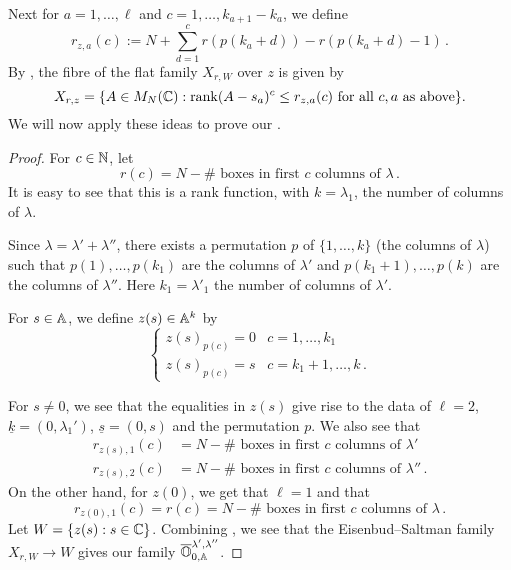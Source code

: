 \documentclass{article}
\begin{document}
Next for $ a = 1, \dots, \ell $ and $ c = 1, \dots, k_{a+1} - k_a$, we define
$$
    r_{z,a}(c):= N + \sum_{d = 1}^c r(p(k_a + d)) - r(p(k_a + d) - 1)  \, . 
$$
By \cite[Corollary 2.2]{eisenbud1989rank}, the fibre of the flat family $ X_{r,W} $ over $ z$ is given by
\begin{equation} 
    \label{eq:ESfibre}
    X_{r,z} = \{ A \in M_N(\CC) :\rk (A-s_a)^c\le r_{z,a}(c) \text{ for all } c , a \text{ as above}\}.
\end{equation}
% 
We will now apply these ideas to prove our .
% 
\begin{proof}
% 
For $ c\in \NN$, let
$$
    r(c) = N - \#\text{~boxes in first $c$ columns of }\lambda\,.
$$
It is easy to see that this is a rank function, with $ k = \lambda_1$, the number of columns of $ \lambda$.

Since $\lambda = \lambda' + \lambda''$, there exists a permutation $ p $ of $ \{1, \dots, k\}$ (the columns of $ \lambda$) such that $ p(1), \dots, p(k_1) $ are the columns of $ \lambda'$ and $ p(k_1+1), \dots, p(k)$ are the columns of $ \lambda''$. Here $ k_1 = \lambda'_1$ the number of columns of $ \lambda'$.

For $ s \in \AA$, we define $ z(s) \in \AA^k$ by 
\[
\begin{cases}
    z(s)_{p(c)} = 0 &  c = 1, \dots, k_1 \\
    z(s)_{p(c)} = s &  c = k_1 + 1, \dots, k\,.
\end{cases}    
\]

For $ s \ne 0$, we see that the equalities in $ z(s) $ give rise to the data of \(\ell = 2\), \(\underline k = (0,\lambda_1')\), \(\underline s = ( 0, s)\) and the permutation $p$.
We also see that
\begin{equation} 
\label{eq:rcols}
    \begin{split}
            r_{z(s), 1}(c) &=  N - \#\text{~boxes in first $c$ columns of }\lambda' \\
            r_{z(s), 2}(c) &=  N - \#\text{~boxes in first $c$ columns of }\lambda'' \,. 
    \end{split}
\end{equation}
On the other hand, for $z(0)$, we get that $ \ell = 1$ and that 
\begin{equation} 
\label{eq:rcol2}
    r_{z(0),1}(c) = 
    r(c) = N - \#\text{~boxes in first $c$ columns of }\lambda\,. 
\end{equation}
% 
Let $ W = \{ z(s) : s \in \CC \}$. Combining , we see that the Eisenbud--Saltman family $ X_{r, W} \rightarrow W $ gives our family $ \overline{\OO}^{\lambda', \lambda''}_{0, \AA}$.
\end{proof}
% 
\end{document}

